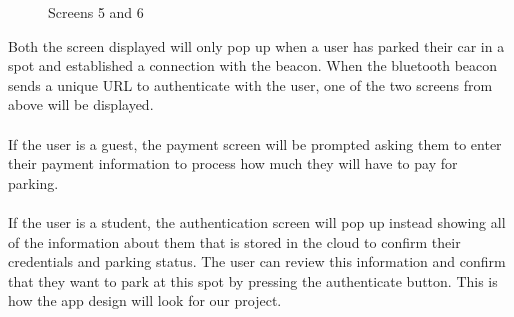 \documentclass[paper=a4, fontsize=12pt]{scrartcl}
\numberwithin{equation}{section}		%
\numberwithin{figure}{section}			%
\numberwithin{table}{section}				%
\begin{document}
\begin{figure}[H]
    \centering
    \qquad
    \caption{Screens 5 and 6}
\end{figure}

Both the screen displayed will only pop up when a user has parked their car in a spot and established a connection with the beacon. When the bluetooth beacon sends a unique URL to authenticate with the user, one of the two screens from above will be displayed.
\\\\
If the user is a guest, the payment screen will be prompted asking them to enter their payment information to process how much they will have to pay for parking.
\\\\
If the user is a student, the authentication screen will pop up instead showing all of the information about them that is stored in the cloud to confirm their credentials and parking status. The user can review this information and confirm that they want to park at this spot by pressing the authenticate button. This is how the app design will look for our project.
\end{document}
